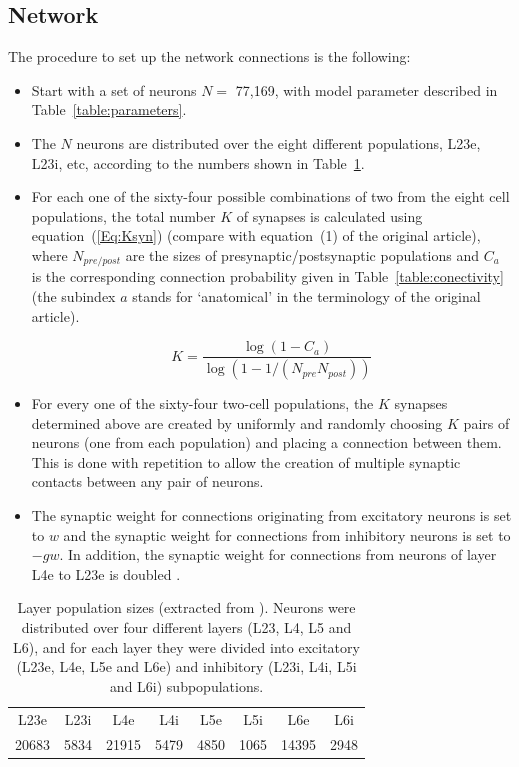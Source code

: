 \documentclass[10pt,a4paper,onecolumn]{article}
\begin{document}
\subsection{Network}
The procedure to set up the network connections is the following: 
\begin{itemize}
\item Start with a set of neurons $N=$ 77,169, with model parameter described in Table~\ref{table:parameters}.

\item The $N$ neurons are distributed over the eight different populations, L23e, L23i, etc, according to the numbers shown in Table~\ref{table:population}.

\item For each one of the sixty-four possible combinations of two from the eight cell populations, the total number $K$ of synapses is calculated using equation~(\ref{Eq:Ksyn}) (compare with equation~(1) of the original article), where $N_{pre/post}$ are the sizes of presynaptic/postsynaptic populations and $C_a$ is the corresponding connection probability given in Table~\ref{table:conectivity} (the subindex $a$ stands for `anatomical' in the terminology of the original article).

\begin{equation}
\label{Eq:Ksyn}
K = \frac{\log(1 - C_a)}{\log(1-1/(N_{pre}N_{post}))}
\end{equation}

\item For every one of the sixty-four two-cell populations, the $K$ synapses determined above are created by uniformly and randomly choosing $K$ pairs of neurons (one from each population) and placing a connection between them. This is done with repetition to allow the creation of multiple synaptic contacts between any pair of neurons. 

\item The synaptic weight for connections originating from excitatory neurons is set to $w$ and the synaptic weight for connections from inhibitory neurons is set to $-gw$. In addition, the synaptic weight for connections from neurons of layer L4e to L23e is doubled \cite{potjans2014,wagatsuma2011}.
\end{itemize}

\begin{table}[!ht]
  \caption{\label{table:population} Layer population sizes (extracted from \cite{potjans2014}). Neurons were distributed over four different layers (L23, L4, L5 and L6), and for each layer they were divided into excitatory (L23e, L4e, L5e and L6e) and inhibitory (L23i, L4i, L5i and L6i) subpopulations.}
 \begin{center}
  \begin{tabular}{cccccccc}
   \toprule
   \midrule
 L23e & L23i & L4e & L4i & L5e & L5i & L6e & L6i\tabularnewline
 20683 & 5834 & 21915 & 5479 & 4850 & 1065 & 14395 & 2948\tabularnewline
   \bottomrule
  \end{tabular}
 \end{center}
\end{table}
\end{document}
